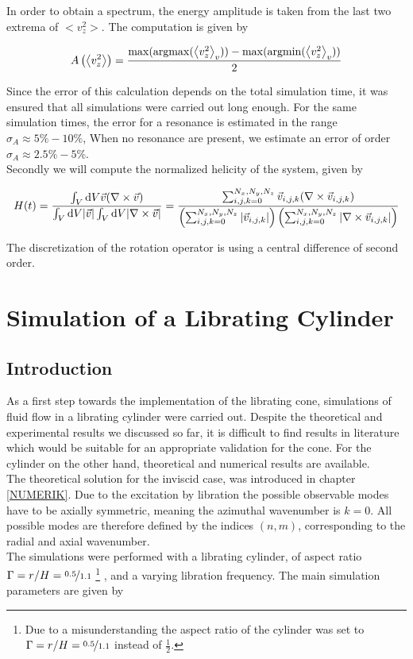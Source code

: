 In order to obtain a spectrum, the energy amplitude is taken from the last two extrema of $<v_z^2>$.
The computation is given by

\begin{align}
    A\left(\left<v_z^2\right>\right) = \frac{\max(\operatorname*{argmax}(\left<v_z^2\right>_{v})) - \max(\operatorname*{argmin}(\left<v_z^2\right>_{v}))}{2}
\end{align}

Since the error of this calculation depends on the total simulation time, it was ensured that all simulations
were carried out long enough.
For the same simulation times, the error for a resonance is estimated in the range $\sigma_A \approx 5\% - 10\%$,
When no resonance are present, we estimate an error of order $\sigma_A \approx 2.5\% - 5\%$.\\
Secondly we will  compute the normalized helicity of the system, given by

\begin{align}
H(t) = \frac{\int_V \mathop{}\!\mathrm{d} V \vec{v} (\nabla \times \vec{v})}
{\int_V \mathop{}\!\mathrm{d} V |\vec{v}| \int_V \mathop{}\!\mathrm{d} V |\nabla \times \vec{v}|}
 = \frac{\sum_{i,j,k=0}^{N_x, N_y, N_z} \vec{v}_{i,j,k} (\nabla \times \vec{v}_{i, j, k})}
 {\left(\sum_{i,j,k=0}^{N_x, N_y, N_z}|\vec{v}_{i,j,k}|\right)
 \left(\sum_{i,j,k=0}^{N_x, N_y, N_z}
 | \nabla \times \vec{v}_{i, j, k}|\right)}
\end{align}

The discretization of the rotation operator is using a central difference of second order.
\clearpage


\section{Simulation of a Librating Cylinder}
\subsection{Introduction}
\label{cone:sec:lib_cylinder}

As a first step towards the implementation of the librating cone, simulations of fluid flow in a librating cylinder were carried out.
Despite the theoretical and experimental results we discussed so far,
it is difficult to find results in literature which would be suitable for an appropriate validation for the cone.
For the cylinder on the other hand, theoretical and numerical results are available.\\
The theoretical solution for the inviscid case, was introduced in chapter \ref{NUMERIK}.
Due to the excitation by libration the possible observable modes have to be axially symmetric, meaning the azimuthal wavenumber is $k=0$.
All possible modes are therefore defined by the indices $(n, m)$, corresponding to the radial and axial wavenumber.\\
The simulations were performed with a librating cylinder, of aspect ratio $\Gamma=r/H=\nicefrac{0.5}{1.1}$
\footnote{Due to a misunderstanding the aspect ratio of the cylinder was set to $\Gamma=r/H=\nicefrac{0.5}{1.1}$ instead of $\frac{1}{2}$.}
, and a varying libration frequency.
The main simulation parameters are given by


